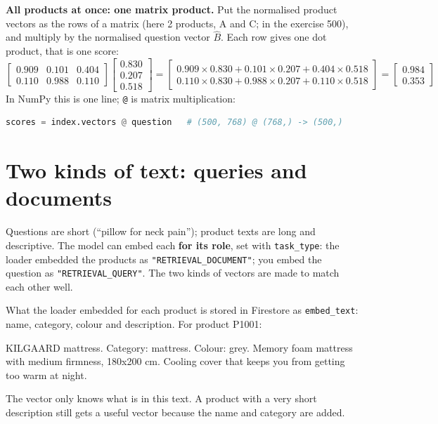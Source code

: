 \documentclass[11pt,a4paper]{article}
\newcommand{\code}[1]{\texttt{#1}}
\begin{document}
\textbf{All products at once: one matrix product.} Put the normalised
product vectors as the rows of a matrix (here 2 products, A and C; in
the exercise 500), and multiply by the normalised question vector
$\hat{B}$. Each row gives one dot product, that is one score:
\[
\begin{bmatrix} 0.909 & 0.101 & 0.404 \\ 0.110 & 0.988 & 0.110 \end{bmatrix}
\begin{bmatrix} 0.830 \\ 0.207 \\ 0.518 \end{bmatrix}
=
\begin{bmatrix}
0.909 \times 0.830 + 0.101 \times 0.207 + 0.404 \times 0.518 \\
0.110 \times 0.830 + 0.988 \times 0.207 + 0.110 \times 0.518
\end{bmatrix}
=
\begin{bmatrix} 0.984 \\ 0.353 \end{bmatrix}
\]
In NumPy this is one line; \code{@} is matrix multiplication:
\begin{lstlisting}[language=Python]
scores = index.vectors @ question   # (500, 768) @ (768,) -> (500,)
\end{lstlisting}

\section{Two kinds of text: queries and documents}

Questions are short (``pillow for neck pain''); product texts are long
and descriptive. The model can embed each \textbf{for its role}, set
with \code{task\_type}: the loader embedded the products as
\code{"RETRIEVAL\_DOCUMENT"}; you embed the question as
\code{"RETRIEVAL\_QUERY"}. The two kinds of vectors are made to match
each other well.

What the loader embedded for each product is stored in Firestore as
\code{embed\_text}: name, category, colour and description. For product
P1001:
\begin{note}
\small KILGAARD mattress. Category: mattress. Colour: grey. Memory foam
mattress with medium firmness, 180x200 cm. Cooling cover that keeps you
from getting too warm at night.
\end{note}
The vector only knows what is in this text. A product with a very short
description still gets a useful vector because the name and category
are added.
\end{document}
